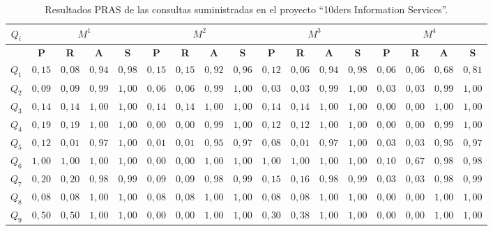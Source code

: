 \documentclass[a4paper,final,11pt,fleqn,twoside]{book}  %
\begin{document}
\begin{sidewaystable}[!t]
  \centering
  \caption{Resultados PRAS de las consultas suministradas en el proyecto ``10ders Information Services''.}\label{table:queries-ir-results}
\begin{tabular}{|c||c|c|c|c||c|c|c|c||c|c|c|c||c|c|c|c|}
\hline
 \textbf{$Q_i$}&\multicolumn{4}{|c||}{$M^{1}$} & \multicolumn{4}{|c||}{$M^{2}$}& \multicolumn{4}{|c||}{$M^{3}$} & \multicolumn{4}{|c|}{$M^{4}$} \\ \hline
	  &\textbf{P} & \textbf{R} & \textbf{A} & \textbf{S} &		\textbf{P} & \textbf{R} & \textbf{A} & \textbf{S} &			\textbf{P} & \textbf{R} & \textbf{A} & \textbf{S} &		\textbf{P} & \textbf{R} & \textbf{A} & \textbf{S}  \\ \hline \hline
$Q_1$  	  &$0,15$ & $0,08$ & $0,94$ & $0,98$ &		$0,15$ & $0,15$ & $0,92$ & $0,96$ &	$0,12$ & $0,06$ & $0,94$ & $0,98$ &	$0,06$ & $0,06$ & $0,68$ & $0,81$ \\ \hline
$Q_2$  	  &$0,09$ & $0,09$ & $0,99$ & $1,00$ & 		$0,06$ & $0,06$ & $0,99$ & $1,00$ & 	$0,03$ & $0,03$ & $0,99$ & $1,00$ & 	$0,03$ & $0,03$ & $0,99$ & $1,00$ \\ \hline
$Q_3$  	  &$0,14$ & $0,14$ & $1,00$ & $1,00$ & 		$0,14$ & $0,14$ & $1,00$ & $1,00$ & 	$0,14$ & $0,14$ & $1,00$ & $1,00$ & 	$0,00$ & $0,00$ & $1,00$ & $1,00$ \\ \hline
$Q_4$  	  &$0,19$ & $0,19$ & $1,00$ & $1,00$ &		$0,00$ & $0,00$ & $0,99$ & $1,00$ & 	$0,12$ & $0,12$ & $1,00$ & $1,00$ & 	$0,00$ & $0,00$ & $0,99$ & $1,00$ \\ \hline
$Q_5$  	  &$0,12$ & $0,01$ & $0,97$ & $1,00$ & 		$0,01$ & $0,01$ & $0,95$ & $0,97$ & 	$0,08$ & $0,01$ & $0,97$ & $1,00$ & 	$0,03$ & $0,03$ & $0,95$ & $0,97$ \\ \hline
$Q_6$  	  &$1,00$ & $1,00$ & $1,00$ & $1,00$ & 		$0,00$ & $0,00$ & $1,00$ & $1,00$ & 	$1,00$ & $1,00$ & $1,00$ & $1,00$ & 	$0,10$ & $0,67$ & $0,98$ & $0,98$ \\ \hline
$Q_7$  	  &$0,20$ & $0,20$ & $0,98$ & $0,99$ & 		$0,09$ & $0,09$ & $0,98$ & $0,99$ & 	$0,15$ & $0,16$ & $0,98$ & $0,99$ & 	$0,03$ & $0,03$ & $0,98$ & $0,99$ \\ \hline
$Q_8$  	  &$0,08$ & $0,08$ & $1,00$ & $1,00$ & 		$0,08$ & $0,08$ & $1,00$ & $1,00$ & 	$0,08$ & $0,08$ & $1,00$ & $1,00$ & 	$0,00$ & $0,00$ & $1,00$ & $1,00$ \\ \hline
$Q_9$  	  &$0,50$ & $0,50$ & $1,00$ & $1,00$ & 		$0,00$ & $0,00$ & $1,00$ & $1,00$ & 	$0,30$ & $0,38$ & $1,00$ & $1,00$ & 	$0,00$ & $0,00$ & $1,00$ & $1,00$ \\ \hline

\end{tabular}
\end{sidewaystable}
\end{document}
